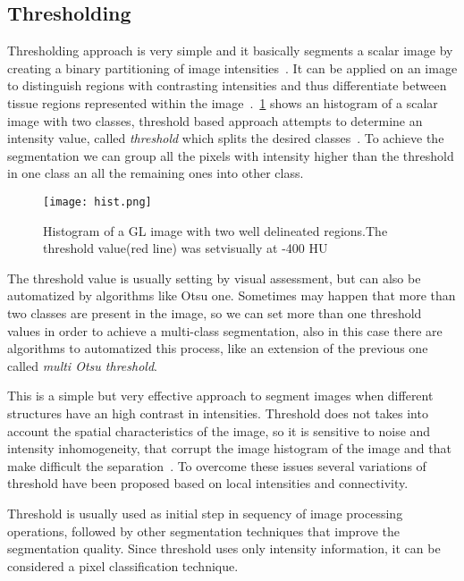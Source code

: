 \documentclass{standalone}
\begin{document}
\subsection{Thresholding}

Thresholding approach is very simple and it basically segments a scalar image by creating a binary partitioning of image intensities~\cite{ART:Pham}. It can be applied on an image to distinguish regions with contrasting intensities and thus differentiate between tissue regions represented within the image~\cite{INP:Withey}. \figurename\,\ref{fig:Histogram} shows an histogram of a scalar image with two classes, threshold based approach attempts to determine an intensity value, called \emph{threshold} which splits the desired classes~\cite{ART:Pham}. To achieve the segmentation we can group all the pixels with intensity higher than the threshold in one class an all the remaining ones into other class. 

\begin{figure}[h!]

	\centering
		\texttt{[image: hist.png]}
	\caption{Histogram of a GL image with two well delineated regions.The threshold value(red line) was setvisually at -400 HU}\label{fig:Histogram}
\end{figure}

The threshold value is usually setting by visual assessment, but can also be automatized by algorithms like Otsu one.
Sometimes may happen that more than two classes are present in the image, so we can set more than one threshold values in order to achieve a multi-class segmentation, also in this case there are algorithms to automatized this process, like an extension of the previous one called \emph{multi Otsu threshold}.

This is a simple but very effective approach to segment images when different structures have an high contrast in intensities. Threshold does not takes into account the spatial characteristics of the image, so it is sensitive to noise and intensity inhomogeneity, that corrupt the image histogram of the image and that make difficult the separation~\cite{ART:Pham}. To overcome these issues several variations of threshold have been proposed based on local intensities and connectivity.

Threshold is usually used as initial step in sequency of image processing operations, followed by other segmentation techniques that improve the segmentation quality. 
Since threshold uses only intensity information, it can be considered a pixel classification technique. 
\end{document}
